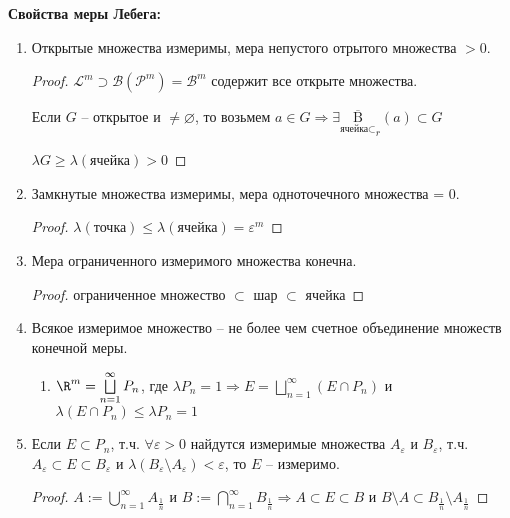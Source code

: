 \textbf{Свойства меры Лебега:}
\begin{enumerate}
    \item Открытые множества измеримы, мера непустого отрытого множества $>0$.
    
    \begin{proof}
        $\mathcal{L}^m\supset \mathcal{B}(\mathcal{P}^m)=\mathcal{B}^m$ содержит все открыте множества.

        Если $G$ – открытое и $\not = \varnothing$, то возьмем $a\in G\Rightarrow
        \exists \underset{\text{ячейка}\subset}{\overline{\text{B}}}_r(a)\subset G$

        $\lambda G\geq \lambda (\text{ячейка})>0$
    \end{proof}
    \item Замкнутые множества измеримы, мера одноточечного множества = 0.
    
    \begin{proof}
        $\lambda(\text{точка})\leq \lambda (\text{ячейка}) =\varepsilon^m$
    \end{proof}

    \item Мера ограниченного измеримого множества конечна.
    
    \begin{proof}
        ограниченное множество $\subset$ шар $\subset$ ячейка
    \end{proof}

    \item Всякое измеримое множество – не более чем счетное объединение множеств конечной меры.
    
    \begin{enumerate}
        \item $\R^m =\bigsqcup\limits_{n=1}^\infty P_n$, где $\lambda P_n = 1\Rightarrow E =\bigsqcup\limits_{n=1}^\infty (E\cap P_n)$ и
        $\lambda (E\cap P_n)\leq \lambda P_n = 1$
    \end{enumerate}

    \item Если $E\subset P_n$, т.ч. $\forall \varepsilon > 0$ найдутся измеримые множества
    $A_\varepsilon$ и $B_\varepsilon$, т.ч. $A_\varepsilon\subset E \subset B_\varepsilon$ и 
    $\lambda (B_\varepsilon\setminus A_\varepsilon)< \varepsilon$, то $E$ – измеримо.
    
    \begin{proof}
        $A:=\bigcup\limits_{n=1}^\infty A_{\frac{1}{n}}$ и $B:=\bigcap\limits_{n=1}^\infty B_{\frac{1}{n}}\Rightarrow
        A\subset E \subset B$ и $B\setminus A \subset B_{\frac{1}{n}}\setminus A_{\frac{1}{n}}$


\end{proof}
\end{enumerate}

